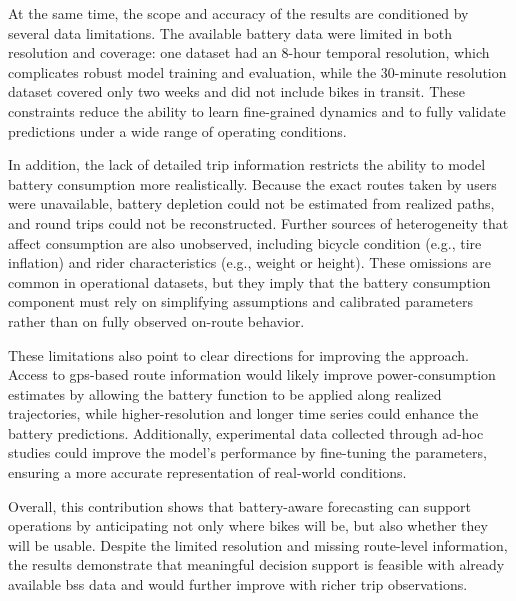 At the same time, the scope and accuracy of the results are conditioned by several data limitations. The available battery data were limited in both resolution and coverage: one dataset had an 8-hour temporal resolution, which complicates robust model training and evaluation, while the 30-minute resolution dataset covered only two weeks and did not include bikes in transit. These constraints reduce the ability to learn fine-grained dynamics and to fully validate predictions under a wide range of operating conditions.

In addition, the lack of detailed trip information restricts the ability to model battery consumption more realistically. Because the exact routes taken by users were unavailable, battery depletion could not be estimated from realized paths, and round trips could not be reconstructed. Further sources of heterogeneity that affect consumption are also unobserved, including bicycle condition (e.g., tire inflation) and rider characteristics (e.g., weight or height). These omissions are common in operational datasets, but they imply that the battery consumption component must rely on simplifying assumptions and calibrated parameters rather than on fully observed on-route behavior.

These limitations also point to clear directions for improving the approach. Access to \ac{gps}-based route information would likely improve power-consumption estimates by allowing the battery function to be applied along realized trajectories, while higher-resolution and longer time series could enhance the battery predictions. Additionally, experimental data collected through ad-hoc studies could improve the model's performance by fine-tuning the parameters, ensuring a more accurate representation of real-world conditions.

Overall, this contribution shows that battery-aware forecasting can support operations by anticipating not only where bikes will be, but also whether they will be usable. Despite the limited resolution and missing route-level information, the results demonstrate that meaningful decision support is feasible with already available \ac{bss} data and would further improve with richer trip observations.
